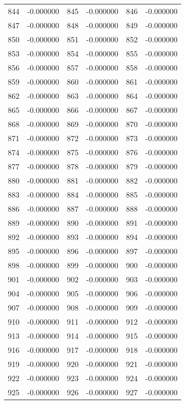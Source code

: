 \documentclass[12pt]{article}
\begin{document}
\begin{longtable}{@{}cc|cc|cc@{}}
844 & -0.000000 & 845 & -0.000000 & 846 & -0.000000 \\
847 & -0.000000 & 848 & -0.000000 & 849 & -0.000000 \\
850 & -0.000000 & 851 & -0.000000 & 852 & -0.000000 \\
853 & -0.000000 & 854 & -0.000000 & 855 & -0.000000 \\
856 & -0.000000 & 857 & -0.000000 & 858 & -0.000000 \\
859 & -0.000000 & 860 & -0.000000 & 861 & -0.000000 \\
862 & -0.000000 & 863 & -0.000000 & 864 & -0.000000 \\
865 & -0.000000 & 866 & -0.000000 & 867 & -0.000000 \\
868 & -0.000000 & 869 & -0.000000 & 870 & -0.000000 \\
871 & -0.000000 & 872 & -0.000000 & 873 & -0.000000 \\
874 & -0.000000 & 875 & -0.000000 & 876 & -0.000000 \\
877 & -0.000000 & 878 & -0.000000 & 879 & -0.000000 \\
880 & -0.000000 & 881 & -0.000000 & 882 & -0.000000 \\
883 & -0.000000 & 884 & -0.000000 & 885 & -0.000000 \\
886 & -0.000000 & 887 & -0.000000 & 888 & -0.000000 \\
889 & -0.000000 & 890 & -0.000000 & 891 & -0.000000 \\
892 & -0.000000 & 893 & -0.000000 & 894 & -0.000000 \\
895 & -0.000000 & 896 & -0.000000 & 897 & -0.000000 \\
898 & -0.000000 & 899 & -0.000000 & 900 & -0.000000 \\
901 & -0.000000 & 902 & -0.000000 & 903 & -0.000000 \\
904 & -0.000000 & 905 & -0.000000 & 906 & -0.000000 \\
907 & -0.000000 & 908 & -0.000000 & 909 & -0.000000 \\
910 & -0.000000 & 911 & -0.000000 & 912 & -0.000000 \\
913 & -0.000000 & 914 & -0.000000 & 915 & -0.000000 \\
916 & -0.000000 & 917 & -0.000000 & 918 & -0.000000 \\
919 & -0.000000 & 920 & -0.000000 & 921 & -0.000000 \\
922 & -0.000000 & 923 & -0.000000 & 924 & -0.000000 \\
925 & -0.000000 & 926 & -0.000000 & 927 & -0.000000 \\

\end{longtable}
\end{document}
